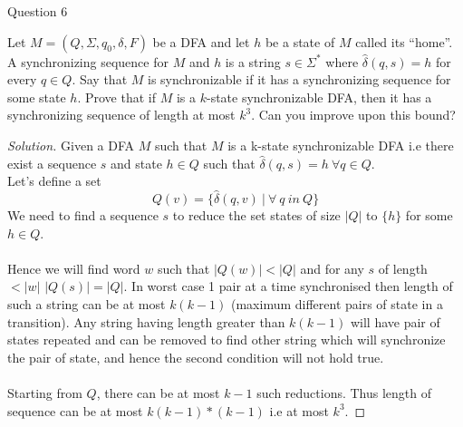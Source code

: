 \begin{solution}{Question 6}\label{ques:6}
    \begin{question}
        Let $M = (Q, \Sigma, q_0, \delta, F)$ be a DFA and let $h$ be a state of $M$ called its ``home”. A synchronizing sequence for $M$ and $h$ is a string $s \in \Sigma^*$ where $\hat{\delta}(q, s) = h$ for
		every $q \in Q$. Say that $M$ is synchronizable if it has a synchronizing sequence for some state $h$. Prove that if $M$ is a $k$-state synchronizable DFA, then it has a synchronizing sequence of length at most $k^3$. Can you improve upon this bound?
    \end{question}
    \tcblower{}
    \begin{proof}[Solution]
        Given a DFA $M$ such that $M$ is a k-state synchronizable DFA i.e there exist a sequence $s$ and state $h \in Q$ such that $\hat{\delta}(q, s) = h\ \forall q \in Q$.
        \\
        Let's define a set
        \[Q(v) = \{\hat{\delta}(q, v)\ |\ \forall\ q\ in\ Q\}\]
        We need to find a sequence $s$ to reduce the set states of size $|Q|$ to $\{h\}$ for some $h \in Q$. 
        \\
        \\
        Hence we will find word $w$ such that $|Q(w)| < |Q|$ and for any $s$ of length $ < |w|$ $|Q(s)| = |Q|$. In worst case 1 pair at a time synchronised then length of such a string can be at most $k(k-1)$ (maximum different pairs of state in a transition). Any string having length greater than $k(k-1)$ will have pair of states repeated and can be removed to find other string which will synchronize the pair of state, and hence the second condition will not hold true.
        \\
        \\
        Starting from $Q$, there can be at most $k-1$ such reductions. Thus length of sequence can be at most $k(k-1)*(k-1)$ i.e at most $k^3$.
    \end{proof}
\end{solution}
